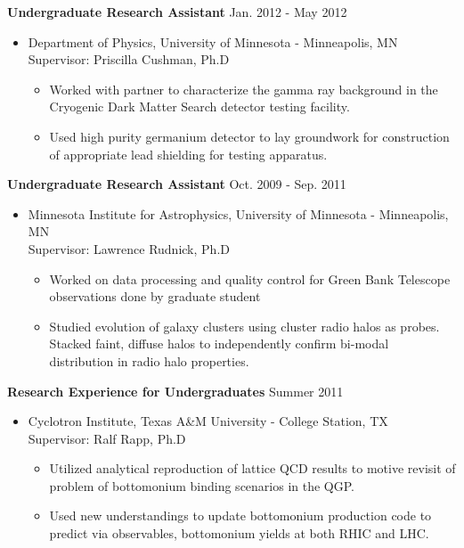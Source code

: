 \documentclass[10pt]{article}
\newenvironment{innerlist}[1][\enskip\textbullet]%
        {\begin{itemize}[#1,leftmargin=*,parsep=0pt,itemsep=0pt,topsep=0pt,partopsep=0pt]}
        {\end{itemize}}
\begin{document}
\textbf{Undergraduate Research Assistant} \hfill {Jan. 2012 - May 2012}
\begin{innerlist}

\item[] Department of Physics, University of Minnesota - Minneapolis, MN\\
		Supervisor: Priscilla Cushman, Ph.D

		\begin{innerlist}		
		\item Worked with partner to characterize the gamma ray background in the 
		Cryogenic Dark Matter Search detector testing facility.
		\item Used high purity germanium detector to lay groundwork for construction
		of appropriate lead shielding for testing apparatus.
		\end{innerlist}

\end{innerlist}

\textbf{Undergraduate Research Assistant} \hfill {Oct. 2009 - Sep. 2011}
\begin{innerlist}

\item[] Minnesota Institute for Astrophysics, University of Minnesota - Minneapolis, MN\\
		Supervisor: Lawrence Rudnick, Ph.D

		\begin{innerlist}
		\item Worked on data processing and quality control for Green Bank Telescope
		observations done by graduate student
		\item Studied evolution of galaxy clusters using cluster radio halos as probes. Stacked
		faint, diffuse halos to independently confirm bi-modal distribution in radio halo properties.
		\end{innerlist}

\end{innerlist}

\textbf{Research Experience for Undergraduates} \hfill {Summer 2011}
\begin{innerlist}

\item[] Cyclotron Institute, Texas A\&M University - College Station, TX\\
        Supervisor: Ralf Rapp, Ph.D

        \begin{innerlist}
        \item Utilized analytical reproduction of lattice QCD results to motive revisit
        of problem of bottomonium binding scenarios in the QGP.
        \item Used new understandings to update bottomonium production code to predict 
        via observables, bottomonium yields at both RHIC and LHC.
        \end{innerlist}

\end{innerlist}
\end{document}
